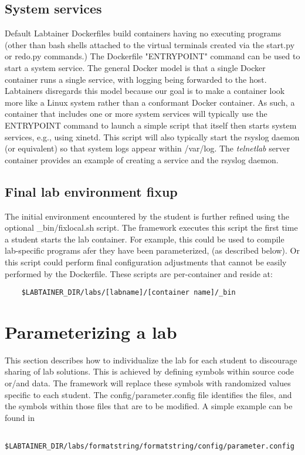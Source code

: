 \documentclass{article}
\begin{document}
\subsection {System services}
Default Labtainer Dockerfiles build containers having no executing programs (other than
bash shells attached to the virtual terminals created via the start.py or redo.py commands.)  
The Dockerfile "ENTRYPOINT" command can be used to start a system service.  The general Docker 
model is that a single Docker container runs a single service, with logging being forwarded to 
the host.  Labtainers disregards this model because our goal is to make a container look more like a Linux
system rather than a conformant Docker container. As such, a container that includes one or more
system services will typically use the ENTRYPOINT command to launch a simple script that itself then
starts system services, e.g., using xinetd.  This script will also typically start the rsyslog
daemon (or equivalent) so that system logs appear within /var/log.  The \textit{telnetlab} server container
provides an example of creating a service and the rsyslog daemon.


\subsection{Final lab environment fixup}
The initial environment encountered by the student is further refined using
the optional \_bin/fixlocal.sh script.  The framework executes
this script the first time a student starts the lab container.  For example,
this could be used to compile lab-specific programs afer they have been parameterized,
(as described below).  Or this script could perform final configuration adjustments
that cannot be easily performed by the Dockerfile.  These scripts are per-container
and reside at:
\begin{verbatim}
    $LABTAINER_DIR/labs/[labname]/[container name]/_bin
\end{verbatim}

\section{Parameterizing a lab}
This section describes how to individualize the lab for each student to discourage
sharing of lab solutions.  This is achieved by defining symbols within source 
code or/and data.  The framework will replace these symbols with randomized values
specific to each student.  The config/parameter.config file identifies the files, and
the symbols within those files that are to be modified.  A simple example can be found in 
\begin{verbatim}
    $LABTAINER_DIR/labs/formatstring/formatstring/config/parameter.config
\end{verbatim}
\end{document}
